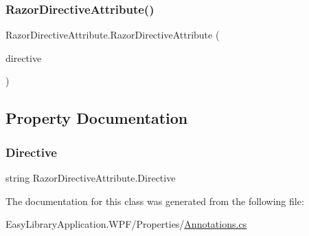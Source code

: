\subsubsection{\texorpdfstring{Razor\+Directive\+Attribute()}{RazorDirectiveAttribute()}}
{\footnotesize\ttfamily Razor\+Directive\+Attribute.\+Razor\+Directive\+Attribute (\begin{DoxyParamCaption}\item[{\mbox{[}\+Not\+Null\mbox{]} string}]{directive }\end{DoxyParamCaption})}



\subsection{Property Documentation}
\mbox{\label{class_razor_directive_attribute_a7c4cd40e119b2c1c2598ee7d66c3d3e9}} 
\subsubsection{\texorpdfstring{Directive}{Directive}}
{\footnotesize\ttfamily string Razor\+Directive\+Attribute.\+Directive\hspace{0.3cm}{\ttfamily [get]}}



The documentation for this class was generated from the following file\+:\begin{DoxyCompactItemize}
\item 
Easy\+Library\+Application.\+W\+P\+F/\+Properties/\mbox{\hyperlink{_annotations_8cs}{Annotations.\+cs}}\end{DoxyCompactItemize}

